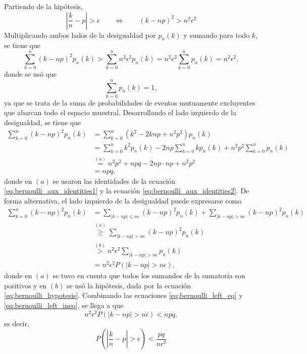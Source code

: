 \documentclass[a4paper]{report}
\begin{document}
Partiendo de la hipótesis,
\begin{equation}\label{eq:bernoulli_hypotesis}
 \left|\frac{k}{n}-p\right|>\epsilon\qquad\Longleftrightarrow\qquad (k-np)^2>n^2\epsilon^2
\end{equation}
Multiplicando ambos lados de la desigualdad por \(p_n(k)\) y sumando para todo \(k\), se tiene que
\begin{equation}\label{eq:bernoulli_ineq1}
 \sum_{k=0}^{n}(k-np)^2p_n(k)>\sum_{k=0}^{n}n^2\epsilon^2p_n(k)=n^2\epsilon^2\sum_{k=0}^{n}p_n(k)=n^2\epsilon^2,
\end{equation}
donde se usó que 
\begin{equation}\label{eq:bernoulli_aux_identities2}
 \sum_{k=0}^{n}p_n(k)=1,
\end{equation}
ya que se trata de la suma de probabilidades de eventos mutuamente excluyentes que abarcan todo el espacio muestral. Desarrollando el lado izquierdo de la desigualdad, se tiene que
\begin{align}\label{eq:bernoulli_left_eq}
 \sum_{k=0}^{n}(k-np)^2p_n(k)&=\sum_{k=0}^{n}(k^2-2knp+n^2p^2)p_n(k)\nonumber\\
  &=\sum_{k=0}^{n}k^2p_n(k)-2np\sum_{k=0}^{n}kp_n(k)+n^2p^2\sum_{k=0}^{n}p_n(k)\nonumber\\
  &\overset{(a)}{=}n^2p^2+npq-2np\cdot np+n^2p^2\nonumber\\
  &=npq,
\end{align}
donde en \((a)\) se usaron las identidades de la ecuación \ref{eq:bernoulli_aux_identities1} y la ecuación \ref{eq:bernoulli_aux_identities2}. De forma alternativa, el lado izquierdo de la desigualdad puede expresarse como
\begin{align}\label{eq:bernoulli_left_ineq}
 \sum_{k=0}^{n}(k-np)^2p_n(k)&=\sum_{|k-np|\leq n\epsilon}(k-np)^2p_n(k)+\sum_{|k-np|>n\epsilon}(k-np)^2p_n(k)\nonumber\\
  &\overset{(a)}{\geq}\sum_{|k-np|>n\epsilon}(k-np)^2p_n(k)\nonumber\\
  &\overset{(b)}{>}n^2\epsilon^2\sum_{|k-np|>n\epsilon}p_n(k)\nonumber\\
  &=n^2\epsilon^2P\left(|k-np|>n\epsilon\right),
\end{align}
donde en \((a)\) se tuvo en cuenta que todos los sumandos de la sumatoria son positivos y en \((b)\) se usó la hipótesis, dada por la ecuación \ref{eq:bernoulli_hypotesis}. Combinando las ecuaciones \ref{eq:bernoulli_left_eq} y \ref{eq:bernoulli_left_ineq}, se llega a que
\[
 n^2\epsilon^2P\left(|k-np|>n\epsilon\right)<npq,
\]
es decir,
\[
 P\left(\left|\frac{k}{n}-p\right|>\epsilon\right)<\frac{pq}{n\epsilon^2}
\]
\end{document}
